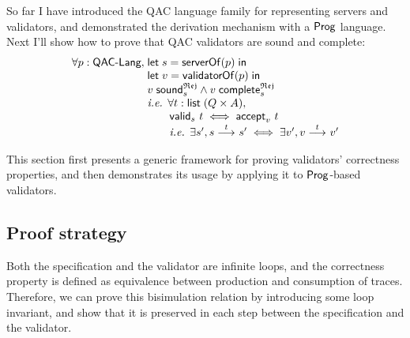 So far I have introduced the QAC language family for representing servers and
validators, and demonstrated the derivation mechanism with a $\mathsf{Prog}$ language.
Next I'll show how to prove that QAC validators are sound and complete:
\[\begin{array}{r@{\;}l}
\forall p:\Lang,&\letin{s}{\serverOf(p)}\\
&\letin{v}{\validatorOf(p)}\\
&\rejSound v s\wedge\rejComplete v s\\
&\text{\it i.e. }\forall t:\List(Q\times A),\\
&\qquad\valid s t\iff\accepts v t\\
&\qquad\text{\it i.e. }\exists s',\behaves s t s'\iff\exists v',\behaves v t v'
\end{array}\]

This section first presents a generic framework for proving validators'
correctness properties, and then demonstrates its usage by applying it to
$\mathsf{Prog}$-based validators.

\subsection{Proof strategy}
\label{sec:strategy}
Both the specification and the validator are infinite loops, and the correctness
property is defined as equivalence between production and consumption of traces.
Therefore, we can prove this bisimulation relation by introducing some loop
invariant, and show that it is preserved in each step between the specification
and the validator.

